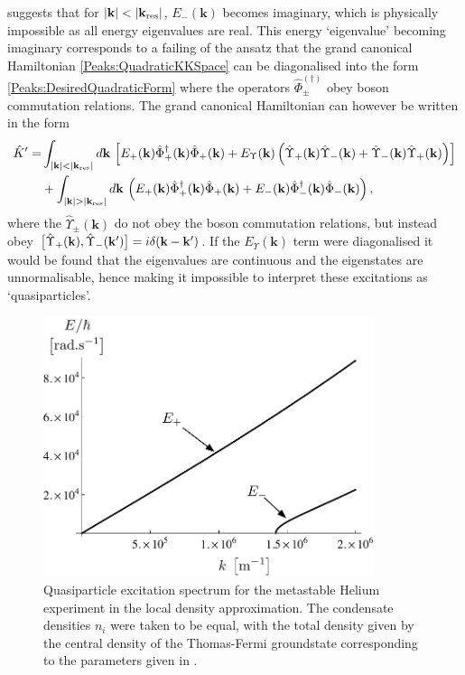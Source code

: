  suggests that for $\left|\mathbf{k}\right| < \left|\mathbf{k}_\text{res}\right|$, $E_-(\mathbf{k})$ becomes imaginary, which is physically impossible as all energy eigenvalues are real. This energy `eigenvalue' becoming imaginary corresponds to a failing of the ansatz that the grand canonical Hamiltonian \eqref{Peaks:QuadraticKKSpace} can be diagonalised into the form \eqref{Peaks:DesiredQuadraticForm} where the operators $\hat{\Phi}_\pm^{(\dagger)}$ obey boson commutation relations. The grand canonical Hamiltonian can however be written in the form
\begin{align}
    \begin{split}
        \hat{K}' =& \int_{\abs{\mathbf{k}}<\abs{\mathbf{k}_\text{res}}} d\mathbf{k}\, \left[ E_+(\mathbf{k}) \hat{\Phi}_+^\dagger(\mathbf{k})\hat{\Phi}_+(\mathbf{k}) + E_\Upsilon(\mathbf{k}) \left( \hat{\Upsilon}_+(\mathbf{k}) \hat{\Upsilon}_-(\mathbf{k}) + \hat{\Upsilon}_-(\mathbf{k}) \hat{\Upsilon}_+(\mathbf{k})\right)\right] \\
        & + \int_{\abs{\mathbf{k}}>\abs{\mathbf{k}_\text{res}}} d\mathbf{k}\, \left( E_+(\mathbf{k}) \hat{\Phi}_+^\dagger(\mathbf{k})\hat{\Phi}_+(\mathbf{k}) + E_-(\mathbf{k}) \hat{\Phi}_-^\dagger(\mathbf{k}) \hat{\Phi}_-(\mathbf{k})\right),
    \end{split}
\end{align}
where the $\hat{\Upsilon}_\pm(\mathbf{k})$ do not obey the boson commutation relations, but instead obey $\big[\hat{\Upsilon}_+(\mathbf{k}), \hat{\Upsilon}_-(\mathbf{k}')\big] = i \delta(\mathbf{k}-\mathbf{k}')$. If the $E_\Upsilon(\mathbf{k})$ term were diagonalised it would be found that the eigenvalues are continuous and the eigenstates are unnormalisable, hence making it impossible to interpret these excitations as `quasiparticles'.

\begin{figure}[tbp]
    \centering
        \includegraphics[height=3in]{QuasiparticleSpectrum}
    \caption{Quasiparticle excitation spectrum for the metastable Helium experiment in the local density approximation. The condensate densities $n_i$ were taken to be equal, with the total density given by the central density of the Thomas-Fermi groundstate corresponding to the parameters given in . }
    \label{Peaks:QuasiparticleSpectrum}
\end{figure}


